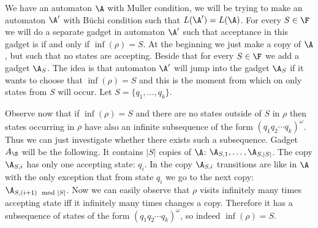 {
We have an automaton $\A$ with Muller condition, we will be trying to make an automaton $\A'$ with
B\"{u}chi condition such that $L(\A') = L(\A)$.
For every $S \in \F$ we will do a separate gadget in automaton $\A'$ such that acceptance in this gadget
is if and only if $\inf(\rho) = S$. At the beginning we just make a copy of $\A$, but such that no states
are accepting. Beside that for every $S \in \F$ we add a gadget $\A_S$. The idea is that automaton $\A'$
will jump into the gadget $\A_S$ if it wants to choose that $\inf(\rho) = S$ and  this is the  moment
from which on only states from $S$ will occur. Let $S = \{q_1, \ldots, q_k\}$.

Observe now that if $\inf(\rho) = S$ and there are no states outside of $S$ in $\rho$ then states occurring in $\rho$
have also an infinite subsequence of the form $(q_1 q_2 \cdots q_k)^\omega$. Thus we can just investigate whether
there exists such a subsequence. Gadget $A_\S$ will be the following. It contains $|S|$ copies of $\A$:
$\A_{S, 1}, \ldots, \A_{S, |S|}$. The copy $\A_{S, i}$ has only one accepting state: $q_i$.
In the copy $\A_{S, i}$ transitions are like in $\A$ with the only exception that from state $q_i$ we go
to the next copy: $\A_{S, (i+1) \mod |S|}$.
Now we can easily observe that $\rho$ visits infinitely many times accepting state iff it infinitely many
times changes a copy. Therefore it has a subsequence of states of the form $(q_1 q_2 \cdots q_k)^\omega$,
so indeed $\inf(\rho) = S$.
}

